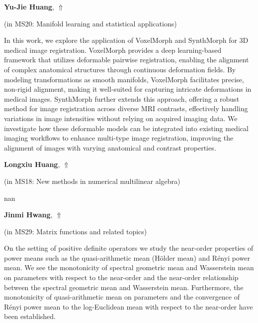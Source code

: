 \documentclass[ILAS2025-program.tex]{subfiles}
\begin{document}
     \hypertarget{down0151}{}\begin{ilasabstract}
    
    \textbf{Yu-Jie Huang},  \hfill \hyperlink{up0151}{$\Uparrow$}
    
    (in {\color{mstitle}MS20: Manifold learning and statistical applications})
        
        \mtskip
    In this work, we explore the application of VoxelMorph and SynthMorph for 3D medical image registration. VoxelMorph provides a deep learning-based framework that utilizes deformable pairwise registration, enabling the alignment of complex anatomical structures through continuous deformation fields. By modeling transformations as smooth manifolds, VoxelMorph facilitates precise, non-rigid alignment, making it well-suited for capturing intricate deformations in medical images. SynthMorph further extends this approach, offering a robust method for image registration across diverse MRI contrasts, effectively handling variations in image intensities without relying on acquired imaging data. We investigate how these deformable models can be integrated into existing medical imaging workflows to enhance multi-type image registration, improving the alignment of images with varying anatomical and contrast properties.\end{ilasabstract}
     \hypertarget{down0191}{}\begin{ilasabstract}
    
    \textbf{Longxiu Huang},  \hfill \hyperlink{up0191}{$\Uparrow$}
    
    (in {\color{mstitle}MS18: New methods in numerical multilinear algebra})
        
        \mtskip
    nan\end{ilasabstract}
     \hypertarget{down0015}{}\begin{ilasabstract}
    
    \textbf{Jinmi Hwang},  \hfill \hyperlink{up0015}{$\Uparrow$}
    
    (in {\color{mstitle}MS29: Matrix functions and related topics})
        
        \mtskip
    On the setting of positive definite operators we study the near-order properties of power means such as the quasi-arithmetic mean (H\"{o}lder mean) and R\'{e}nyi power mean. We see the monotonicity of spectral geometric mean and Wasserstein mean on parameters with respect to the near-order and the near-order relationship between the spectral geometric mean and Wasserstein mean. Furthermore, the monotonicity of quasi-arithmetic mean on parameters and the convergence of R\'{e}nyi power mean to the log-Euclidean mean with respect to the near-order have been established.\end{ilasabstract}
\end{document}

